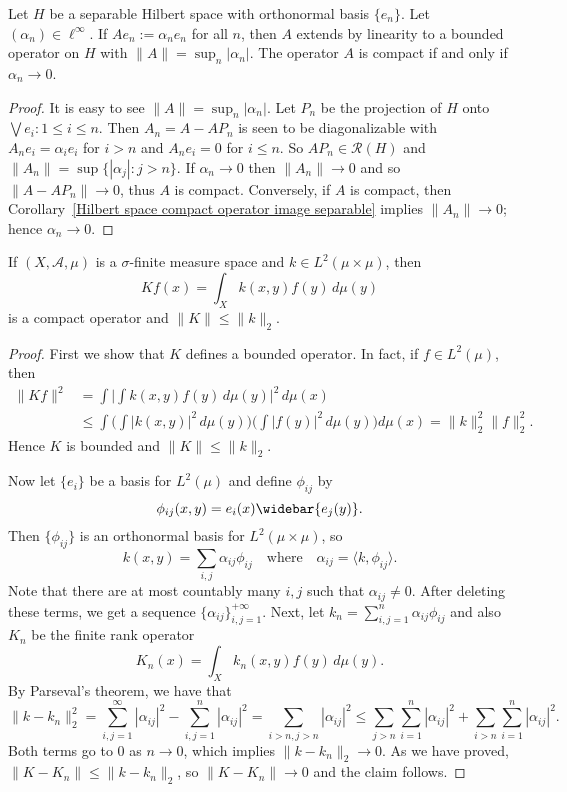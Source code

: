 \begin{proposition}\label{Hilbert space diagonal operator is compact iff}
Let $H$ be a separable Hilbert space with orthonormal basis $\{e_n\}$. Let $(\alpha_n)\in\ell^\infty$. If $Ae_n:=\alpha_ne_n$ for all $n$, then $A$ extends by linearity to a bounded operator on $H$ with $\|A\|=\sup_n|\alpha_n|$. The operator $A$ is compact if and only if $\alpha_n\to 0$.
\end{proposition}
\begin{proof}
It is easy to see $\|A\|=\sup_n|\alpha_n|$. Let $P_n$ be the projection of $H$ onto $\bigvee{e_i:1\leq i\leq n}$. Then $A_n=A-AP_n$ is seen to be diagonalizable with $A_ne_i=\alpha_ie_i$ for $i>n$ and $A_ne_i=0$ for $i\leq n$. So $AP_n\in\mathcal{R}(H)$ and $\|A_n\|=\sup\{|\alpha_j|:j>n\}$. If $\alpha_n\to 0$ then $\|A_n\|\to 0$ and so $\|A-AP_n\|\to 0$, thus $A$ is compact. Conversely, if $A$ is compact, then Corollary~\ref{Hilbert space compact operator image separable} implies $\|A_n\|\to 0$; hence $\alpha_n\to 0$.
\end{proof}
\begin{proposition}\label{Hilbert space integral operator is compact}
If $(X,\mathcal{A},\mu)$ is a $\sigma$-finite measure space and $k\in L^2(\mu\times\mu)$, then
\[Kf(x)=\int_Xk(x,y)f(y)\,d\mu(y)\]
is a compact operator and $\|K\|\leq\|k\|_2$.
\end{proposition}
\begin{proof}
First we show that $K$ defines a bounded operator. In fact, if $f\in L^2(\mu)$, then
\begin{align*}
\|Kf\|^2&=\int\Big|\int k(x,y)f(y)\,d\mu(y)\Big|^2\,d\mu(x)\\
&\leq\int\Big(\int|k(x,y)|^2\,d\mu(y)\Big)\Big(\int|f(y)|^2\,d\mu(y)\Big)d\mu(x)=\|k\|_2^2\|f\|_2^2.
\end{align*}
Hence $K$ is bounded and $\|K\|\leq\|k\|_2$.\par
Now let $\{e_i\}$ be a basis for $L^2(\mu)$ and define $\phi_{ij}$ by
\[\phi_{ij}(x,y)=e_{i}(x)\widebar{e_j(y)}.\]
Then $\{\phi_{ij}\}$ is an orthonormal basis for $L^2(\mu\times\mu)$, so
\[k(x,y)=\sum_{i,j}\alpha_{ij}\phi_{ij}\quad\text{where}\quad \alpha_{ij}=\langle k,\phi_{ij}\rangle.\]
Note that there are at most countably many $i,j$ such that $\alpha_{ij}\neq 0$. After deleting these terms, we get a sequence $\{\alpha_{ij}\}_{i,j=1}^{+\infty}$. Next, let $k_n=\sum_{i,j=1}^{n}\alpha_{ij}\phi_{ij}$ and also $K_n$ be the finite rank operator
\[K_n(x)=\int_Xk_n(x,y)f(y)\,d\mu(y).\]
By Parseval's theorem, we have that
\[\|k-k_n\|_2^2=\sum_{i,j=1}^{\infty}|\alpha_{ij}|^2-\sum_{i,j=1}^{n}|\alpha_{ij}|^2=\sum_{i>n,j>n}|\alpha_{ij}|^2\leq\sum_{j>n}\sum_{i=1}^{n}|\alpha_{ij}|^2+\sum_{i>n}\sum_{i=1}^{n}|\alpha_{ij}|^2.\]
Both terms go to $0$ as $n\to 0$, which implies $\|k-k_n\|_2\to 0$. As we have proved, $\|K-K_n\|\leq\|k-k_n\|_2$, so $\|K-K_n\|\to 0$ and the claim follows.
\end{proof}
